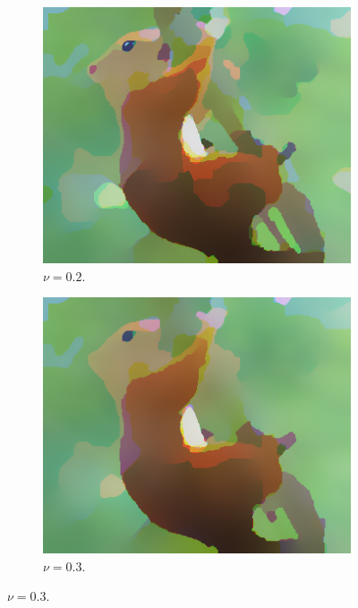 \documentclass[abstracton]{scrreprt}
\begin{document}
\begin{figure}[!ht]
                \begin{subfigure}[b]{0.24\textwidth}
                    \includegraphics[width=\textwidth]{img/segmentation/rt/02squirrel.png}
                    \caption{$\nu = 0.2$.}
                \end{subfigure}
                \begin{subfigure}[b]{0.24\textwidth}
                    \includegraphics[width=\textwidth]{img/segmentation/rt/03squirrel.png}
                    \caption{$\nu = 0.3$.}
                \end{subfigure}

\end{figure}
\end{document}
